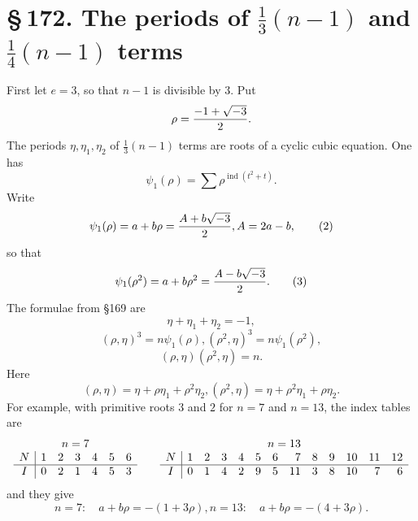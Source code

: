 \documentclass[11pt]{article}
\providecommand{\sect}[2]{\section*{\S\,#1. #2}}
\providecommand{\ind}{\operatorname{ind}}
\begin{document}
\sect{172}{The periods of $\frac13(n-1)$ and $\frac14(n-1)$ terms}

First let $e=3$, so that $n-1$ is divisible by $3$. Put
\[
        \rho={-1+\sqrt{-3}\over2}.
\]
The periods $\eta,
\eta_1,
\eta_2$ of $\frac13(n-1)$ terms are roots of a cyclic cubic equation. One has
\[
        \psi_1(\rho)=
        \sum \rho^{\ind(t^2+t)}.                                      \tag{1}
\]
Write
\[
        \psi_1(\rho)=a+b\rho={A+b\sqrt{-3}\over2},
        A=2a-b,                                                        \tag{2}
\]
so that
\[
        \psi_1(\rho^2)=a+b\rho^2={A-b\sqrt{-3}\over2}.                 \tag{3}
\]
The formulae from §169 are
\[
        \eta+
\eta_1+
\eta_2=-1,                                                           \tag{4}
\]
\[
        (\rho,
\eta)^3=n\psi_1(\rho),
        (\rho^2,
\eta)^3=n\psi_1(\rho^2),                              \tag{5}
\]
\[
        (\rho,
\eta)(\rho^2,
\eta)=n.                                  \tag{6}
\]
Here
\[
        (\rho,
\eta)=\eta+
\rho\eta_1+
\rho^2\eta_2,
        (\rho^2,
\eta)=\eta+
\rho^2\eta_1+
\rho\eta_2.                                      \tag{7}
\]
For example, with primitive roots $3$ and $2$ for $n=7$ and $n=13$, the index tables are
\[
\begin{array}{c|rrrrrr}
\multicolumn{7}{c}{n=7}\\
N&1&2&3&4&5&6\\ \hline
I&0&2&1&4&5&3
\end{array}
\qquad
\begin{array}{c|rrrrrrrrrrrr}
\multicolumn{13}{c}{n=13}\\
N&1&2&3&4&5&6&7&8&9&10&11&12\\ \hline
I&0&1&4&2&9&5&11&3&8&10&7&6
\end{array}
\]
and they give
\[
        n=7:
        \quad a+b\rho=-(1+3\rho),
        n=13:
        \quad a+b\rho=-(4+3\rho).
\]
\end{document}
